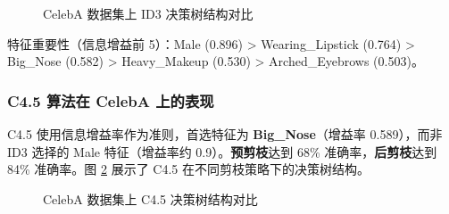 \documentclass[UTF8]{ctexart}
\begin{document}
\begin{figure}[H]
    \centering
    \hfill
    \caption{CelebA 数据集上 ID3 决策树结构对比}
    \label{fig:celeba_id3}
\end{figure}

\noindent 特征重要性（信息增益前 5）：Male (0.896) > Wearing\_Lipstick (0.764) > Big\_Nose (0.582) > Heavy\_Makeup (0.530) > Arched\_Eyebrows (0.503)。

\subsubsection{C4.5 算法在 CelebA 上的表现}

C4.5 使用信息增益率作为准则，首选特征为 \textbf{Big\_Nose}（增益率 0.589），而非 ID3 选择的 Male 特征（增益率约 0.9）。\textbf{预剪枝}达到 68\% 准确率，\textbf{后剪枝}达到 84\% 准确率。图 \ref{fig:celeba_c45} 展示了 C4.5 在不同剪枝策略下的决策树结构。

\begin{figure}[H]
    \centering
    \hfill
    \caption{CelebA 数据集上 C4.5 决策树结构对比}
    \label{fig:celeba_c45}
\end{figure}
\end{document}
